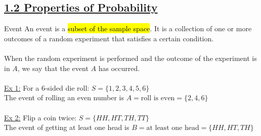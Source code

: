 ﻿\documentclass[12pt]{article}
\begin{document}
\subsection*{\underline{1.2 Properties of Probability}}
\begin{definition}{Event}
An event is a \hl{subset of the sample space}. It is a collection of one or more outcomes of a random experiment that satisfies a certain condition.\\\\
When the random experiment is performed and the outcome of the experiment is in $A$, we say that the event $A$ has occurred.\\\\
\underline{Ex 1:} For a 6-sided die roll: $S = \{1, 2, 3, 4, 5, 6\}$\\
The event of rolling an even number is $A = {\text{roll is even}} = \{2, 4, 6\}$\\\\
\underline{Ex 2:} Flip a coin twice: $S = \{HH, HT, TH, TT\}$\\
The event of getting at least one head is $B = {\text{at least one head}} = \{HH, HT, TH\}$\\
\end{definition}
\end{document}
